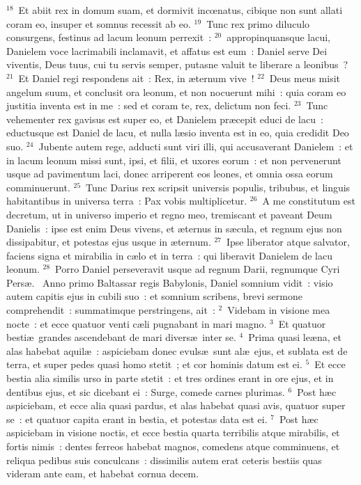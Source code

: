 ${}^{18}$~Et abiit rex in domum suam, et dormivit incœnatus, cibique non sunt allati coram eo, insuper et somnus recessit ab eo.
${}^{19}$~Tunc rex primo diluculo consurgens, festinus ad lacum leonum perrexit~:
${}^{20}$~appropinquansque lacui, Danielem voce lacrimabili inclamavit, et affatus est eum~: Daniel serve Dei viventis, Deus tuus, cui tu servis semper, putasne valuit te liberare a leonibus~?
${}^{21}$~Et Daniel regi respondens ait~: Rex, in \ae ternum vive~!
${}^{22}$~Deus meus misit angelum suum, et conclusit ora leonum, et non nocuerunt mihi~: quia coram eo justitia inventa est in me~: sed et coram te, rex, delictum non feci.
${}^{23}$~Tunc vehementer rex gavisus est super eo, et Danielem pr\ae cepit educi de lacu~: eductusque est Daniel de lacu, et nulla l\ae sio inventa est in eo, quia credidit Deo suo.
${}^{24}$~Jubente autem rege, adducti sunt viri illi, qui accusaverant Danielem~: et in lacum leonum missi sunt, ipsi, et filii, et uxores eorum~: et non pervenerunt usque ad pavimentum laci, donec arriperent eos leones, et omnia ossa eorum comminuerunt.
${}^{25}$~Tunc Darius rex scripsit universis populis, tribubus, et linguis habitantibus in universa terra~: Pax vobis multiplicetur.
${}^{26}$~A me constitutum est decretum, ut in universo imperio et regno meo, tremiscant et paveant Deum Danielis~: ipse est enim Deus vivens, et \ae ternus in s\ae cula, et regnum ejus non dissipabitur, et potestas ejus usque in \ae ternum.
${}^{27}$~Ipse liberator atque salvator, faciens signa et mirabilia in c\ae lo et in terra~: qui liberavit Danielem de lacu leonum.
${}^{28}$~Porro Daniel perseveravit usque ad regnum Darii, regnumque Cyri Pers\ae .
~Anno primo Baltassar regis Babylonis, Daniel somnium vidit~: visio autem capitis ejus in cubili suo~: et somnium scribens, brevi sermone comprehendit~: summatimque perstringens, ait~:
${}^{2}$~Videbam in visione mea nocte~: et ecce quatuor venti c\ae li pugnabant in mari magno.
${}^{3}$~Et quatuor besti\ae\ grandes ascendebant de mari divers\ae\ inter se.
${}^{4}$~Prima quasi le\ae na, et alas habebat aquil\ae~: aspiciebam donec evuls\ae\ sunt al\ae\ ejus, et sublata est de terra, et super pedes quasi homo stetit~; et cor hominis datum est ei.
${}^{5}$~Et ecce bestia alia similis urso in parte stetit~: et tres ordines erant in ore ejus, et in dentibus ejus, et sic dicebant ei~: Surge, comede carnes plurimas.
${}^{6}$~Post h\ae c aspiciebam, et ecce alia quasi pardus, et alas habebat quasi avis, quatuor super se~: et quatuor capita erant in bestia, et potestas data est ei.
${}^{7}$~Post h\ae c aspiciebam in visione noctis, et ecce bestia quarta terribilis atque mirabilis, et fortis nimis~: dentes ferreos habebat magnos, comedens atque comminuens, et reliqua pedibus suis conculcans~: dissimilis autem erat ceteris bestiis quas videram ante eam, et habebat cornua decem.
